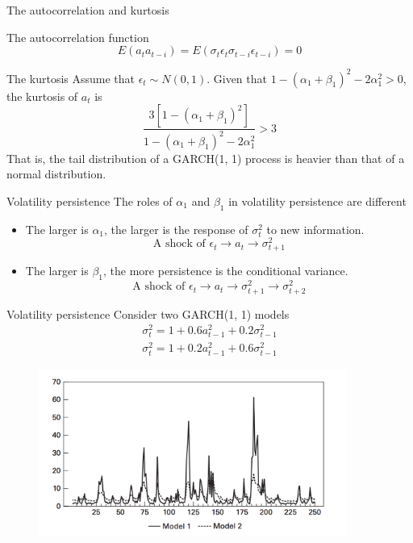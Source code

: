 \documentclass[presentation,10pt]{beamer}
\begin{document}
\begin{frame}[label={sec:orgcde542a}]{The autocorrelation and kurtosis}
\begin{block}{The autocorrelation function}
$$E(a_t a_{t-i}) = E(\sigma_t \epsilon_t \sigma_{t-i} \epsilon_{t-i})
= 0$$
\end{block}

\begin{block}{The kurtosis}
Assume that \(\epsilon_t \sim N(0, 1)\). Given that \(1 - (\alpha_1 +
\beta_1)^2 - 2\alpha^2_1 > 0\), the kurtosis of \(a_t\) is
\begin{equation*}
\frac{3[1 - (\alpha_1 + \beta_1)^2]}{1 - (\alpha_1 + \beta_1)^2 - 2\alpha^2_1} > 3
\end{equation*}
That is, the tail distribution of a GARCH(1, 1) process is heavier
than that of a normal distribution. 
\end{block}
\end{frame}

\begin{frame}[label={sec:orgb1d02ae}]{Volatility persistence}
The roles of \(\alpha_1\) and \(\beta_1\) in volatility persistence are different
\begin{itemize}
\item The larger is \(\alpha_1\), the larger is the response of \(\sigma^2_t\)
to new information. 
\[\text{A shock of } \epsilon_t \rightarrow a_t \rightarrow
  \sigma^2_{t+1} \]

\item The larger is \(\beta_1\), the more persistence is the conditional
variance. 
\[\text{A shock of } \epsilon_t \rightarrow a_t \rightarrow
  \sigma^2_{t+1} \rightarrow \sigma^2_{t+2} \]
\end{itemize}
\end{frame}

\begin{frame}[label={sec:org1f8eba7}]{Volatility persistence}
Consider two GARCH(1, 1) models
\begin{gather*}
\sigma^2_t = 1 + 0.6 a^2_{t-1} + 0.2 \sigma^2_{t-1} \\
\sigma^2_t = 1 + 0.2 a^2_{t-1} + 0.6 \sigma^2_{t-1}
\end{gather*}
\begin{figure}[htbp]
\centering
\includegraphics[width=0.9\textwidth,height=0.6\textheight]{img/volatile_persist.png}
\end{figure}
\end{frame}
\end{document}
